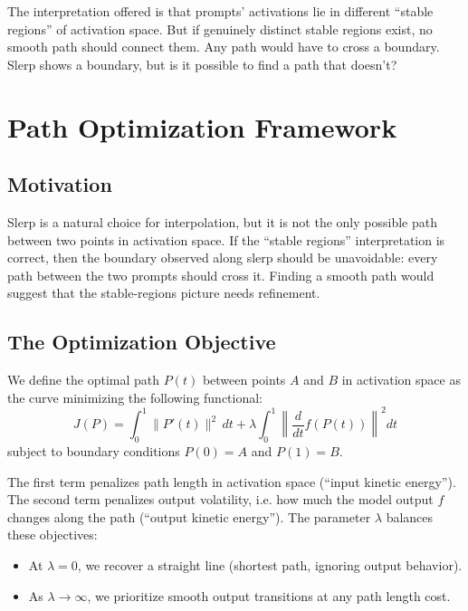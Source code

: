\documentclass[11pt]{article}
\begin{document}
The interpretation offered is that prompts' activations lie in different ``stable regions'' of activation space. But if genuinely distinct stable regions exist, no smooth path should connect them. Any path would have to cross a boundary. Slerp shows a boundary, but is it possible to find a path that doesn't?

\section{Path Optimization Framework}

\subsection{Motivation}

Slerp is a natural choice for interpolation, but it is not the only possible path between two points in activation space. If the ``stable regions'' interpretation is correct, then the boundary observed along slerp should be unavoidable: every path between the two prompts should cross it. Finding a smooth path would suggest that the stable-regions picture needs refinement.

\subsection{The Optimization Objective}

We define the optimal path $P(t)$ between points $A$ and $B$ in activation space as the curve minimizing the following functional:
\begin{equation}
J(P) = \int_0^1 \|P'(t)\|^2 \, dt + \lambda \int_0^1 \left\|\frac{d}{dt}f(P(t))\right\|^2 dt
\end{equation}
subject to boundary conditions $P(0) = A$ and $P(1) = B$.

The first term penalizes path length in activation space (``input kinetic energy''). The second term penalizes output volatility, i.e. how much the model output $f$ changes along the path (``output kinetic energy''). The parameter $\lambda$ balances these objectives:
\begin{itemize}
    \item At $\lambda = 0$, we recover a straight line (shortest path, ignoring output behavior).
    \item As $\lambda \to \infty$, we prioritize smooth output transitions at any path length cost.
\end{itemize}
\end{document}
